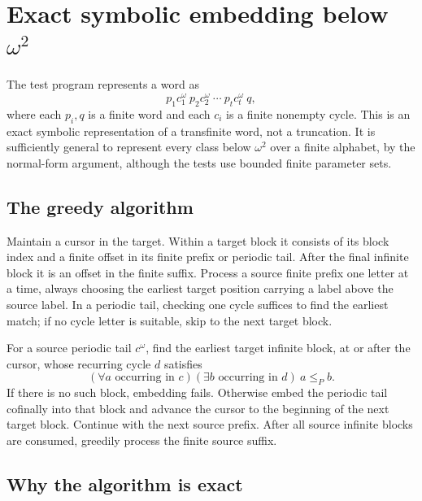 \documentclass[11pt,a4paper]{article}
\numberwithin{equation}{section}
\theoremstyle{definition}
\theoremstyle{remark}
\begin{document}
\section{Exact symbolic embedding below \texorpdfstring{$\omega^2$}{omega squared}}\label{height:app:decision}

The test program represents a word as
\begin{equation}\label{height:eq:symbolic}
  p_1 c_1^\omega\ p_2 c_2^\omega\ \cdots\ p_t c_t^\omega\ q,
\end{equation}
where each $p_i,q$ is a finite word and each $c_i$ is a finite nonempty
cycle. This is an exact symbolic representation of a transfinite word,
not a truncation. It is sufficiently general to represent every class
below $\omega^2$ over a finite alphabet, by the normal-form argument,
although the tests use bounded finite parameter sets.

\subsection{The greedy algorithm}

Maintain a cursor in the target. Within a target block it consists of
its block index and a finite offset in its finite prefix or periodic
tail. After the final infinite block it is an offset in the finite suffix.
Process a source finite prefix one letter at a time, always choosing
the earliest target position carrying a label above the source label.
In a periodic tail, checking one cycle suffices to find the earliest
match; if no cycle letter is suitable, skip to the next target block.

For a source periodic tail $c^\omega$, find the earliest target infinite
block, at or after the cursor, whose recurring cycle $d$ satisfies
\begin{equation}\label{height:eq:cyclecondition}
  (\forall a\text{ occurring in }c)
  (\exists b\text{ occurring in }d)\ a\le_P b.
\end{equation}
If there is no such block, embedding fails. Otherwise embed the periodic
tail cofinally into that block and advance the cursor to the beginning
of the next target block. Continue with the next source prefix. After
all source infinite blocks are consumed, greedily process the finite
source suffix.

\subsection{Why the algorithm is exact}
\end{document}
